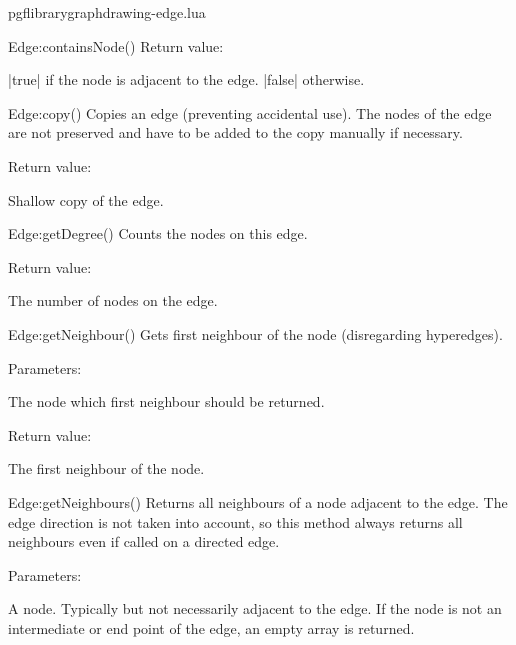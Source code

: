 \begin{filedescription}{pgflibrarygraphdrawing-edge.lua}
\begin{luacommand}{{Edge:containsNode}()}
Return value:
\begin{parameterdescription} 
  \item[] |true| if the node is adjacent to the edge. |false| otherwise. 
\end{parameterdescription}


\end{luacommand}
\begin{luacommand}{{Edge:copy}()}
Copies an edge (preventing accidental use).  The nodes of the edge are not preserved and have to be added to the copy manually if necessary. 


Return value:
\begin{parameterdescription} 
  \item[] Shallow copy of the edge. 
\end{parameterdescription}


\end{luacommand}
\begin{luacommand}{{Edge:getDegree}()}
Counts the nodes on this edge. 


Return value:
\begin{parameterdescription} 
  \item[] The number of nodes on the edge. 
\end{parameterdescription}


\end{luacommand}
\begin{luacommand}{{Edge:getNeighbour}()}
Gets first neighbour of the node (disregarding hyperedges). 

Parameters:
\begin{parameterdescription}
	\item[\meta{node}] The node which first neighbour should be returned. 
\end{parameterdescription}


Return value:
\begin{parameterdescription} 
  \item[] The first neighbour of the node. 
\end{parameterdescription}


\end{luacommand}
\begin{luacommand}{{Edge:getNeighbours}()}
Returns all neighbours of a node adjacent to the edge.  The edge direction is not taken into account, so this method always returns all neighbours even if called on a directed edge. 

Parameters:
\begin{parameterdescription}
	\item[\meta{node}] A node. Typically but not necessarily adjacent to the edge. If the node is not an intermediate or end point of the edge, an empty array is returned. 
\end{parameterdescription}



\end{luacommand}
\end{filedescription}
